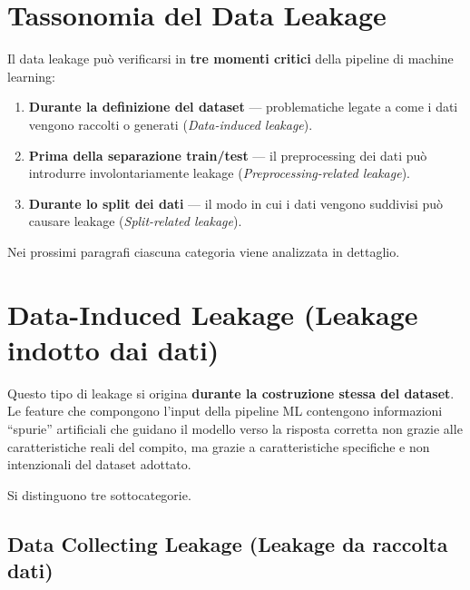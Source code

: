 \documentclass[a4paper,12pt]{article}
\begin{document}
\section{Tassonomia del Data Leakage}

Il data leakage può verificarsi in \textbf{tre momenti critici} della pipeline di machine learning:

\begin{enumerate}[label=\textbf{\arabic*.}]
    \item \textbf{Durante la definizione del dataset} --- problematiche legate a come i dati vengono raccolti o generati (\emph{Data-induced leakage}).
    \item \textbf{Prima della separazione train/test} --- il preprocessing dei dati può introdurre involontariamente leakage (\emph{Preprocessing-related leakage}).
    \item \textbf{Durante lo split dei dati} --- il modo in cui i dati vengono suddivisi può causare leakage (\emph{Split-related leakage}).
\end{enumerate}

Nei prossimi paragrafi ciascuna categoria viene analizzata in dettaglio.

\section{Data-Induced Leakage (Leakage indotto dai dati)}

Questo tipo di leakage si origina \textbf{durante la costruzione stessa del dataset}. Le feature che compongono l'input della pipeline ML contengono informazioni ``spurie'' artificiali che guidano il modello verso la risposta corretta non grazie alle caratteristiche reali del compito, ma grazie a caratteristiche specifiche e non intenzionali del dataset adottato.

Si distinguono tre sottocategorie.

\subsection{Data Collecting Leakage (Leakage da raccolta dati)}
\end{document}
